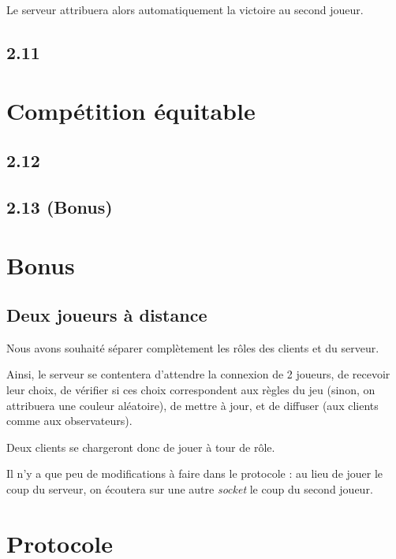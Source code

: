 \documentclass[12pt]{article}
\def\question#1{\subsection{#1}}
\def\sec#1{\section{#1}}
\begin{document}
Le serveur attribuera alors automatiquement la victoire au second joueur. %


\question{2.11}

\sec{Compétition équitable}
\question{2.12}
\question{2.13 (Bonus)}

\sec{Bonus}
\question{Deux joueurs à distance}
Nous avons souhaité séparer complètement les rôles des clients et du serveur.

Ainsi, le serveur se contentera d'attendre la connexion de 2 joueurs, de recevoir leur choix, de vérifier si ces choix correspondent aux règles du jeu (sinon, on attribuera une couleur aléatoire), de mettre à jour, et de diffuser (aux clients comme aux observateurs).

Deux clients se chargeront donc de jouer à tour de rôle.

Il n'y a que peu de modifications à faire dans le protocole : au lieu de jouer le coup du serveur, on écoutera sur une autre \textit{socket} le coup du second joueur.


\sec{Protocole}
\end{document}
